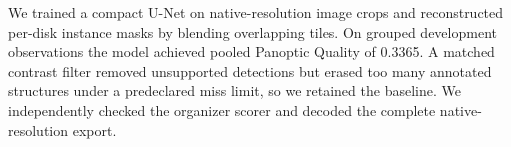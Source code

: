 We trained a compact U-Net on native-resolution image crops and reconstructed per-disk instance masks by blending overlapping tiles. On grouped development observations the model achieved pooled Panoptic Quality of 0.3365. A matched contrast filter removed unsupported detections but erased too many annotated structures under a predeclared miss limit, so we retained the baseline. We independently checked the organizer scorer and decoded the complete native-resolution export.